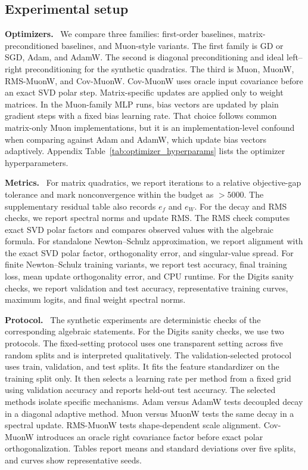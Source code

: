 \documentclass[sigconf,nonacm]{acmart}
\newcommand{\vpara}[1]{\par\noindent\textbf{#1.}\ }
\begin{document}
\subsection{Experimental setup}
\vpara{Optimizers} We compare three families: first-order baselines, matrix-preconditioned baselines, and Muon-style variants. The first family is GD or SGD, Adam, and AdamW. The second is diagonal preconditioning and ideal left--right preconditioning for the synthetic quadratics. The third is Muon, MuonW, RMS-MuonW, and Cov-MuonW. Cov-MuonW uses oracle input covariance before an exact SVD polar step. Matrix-specific updates are applied only to weight matrices. In the Muon-family MLP runs, bias vectors are updated by plain gradient steps with a fixed bias learning rate. That choice follows common matrix-only Muon implementations, but it is an implementation-level confound when comparing against Adam and AdamW, which update bias vectors adaptively. Appendix Table~\ref{tab:optimizer_hyperparams} lists the optimizer hyperparameters.

\vpara{Metrics} For matrix quadratics, we report iterations to a relative objective-gap tolerance and mark nonconvergence within the budget as $>5000$. The supplementary residual table also records $e_f$ and $e_W$. For the decay and RMS checks, we report spectral norms and update RMS. The RMS check computes exact SVD polar factors and compares observed values with the algebraic formula. For standalone Newton--Schulz approximation, we report alignment with the exact SVD polar factor, orthogonality error, and singular-value spread. For finite Newton--Schulz training variants, we report test accuracy, final training loss, mean update orthogonality error, and CPU runtime. For the Digits sanity checks, we report validation and test accuracy, representative training curves, maximum logits, and final weight spectral norms.

\vpara{Protocol} The synthetic experiments are deterministic checks of the corresponding algebraic statements. For the Digits sanity checks, we use two protocols. The fixed-setting protocol uses one transparent setting across five random splits and is interpreted qualitatively. The validation-selected protocol uses train, validation, and test splits. It fits the feature standardizer on the training split only. It then selects a learning rate per method from a fixed grid using validation accuracy and reports held-out test accuracy. The selected methods isolate specific mechanisms. Adam versus AdamW tests decoupled decay in a diagonal adaptive method. Muon versus MuonW tests the same decay in a spectral update. RMS-MuonW tests shape-dependent scale alignment. Cov-MuonW introduces an oracle right covariance factor before exact polar orthogonalization. Tables report means and standard deviations over five splits, and curves show representative seeds.
\end{document}
